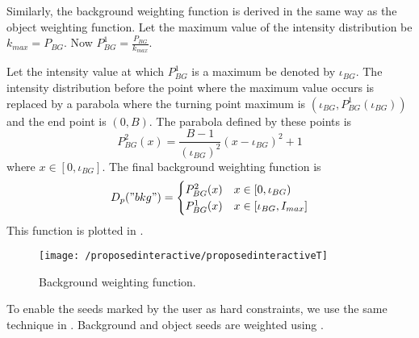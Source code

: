 \begin{definition} 
	Similarly, the background weighting function is derived in the same way as the object weighting function. Let the maximum value of the intensity distribution be $k_{max} = P_{BG}$. Now $P_{BG}^{1} = \frac{P_{BG}}{k_{max}}$.
	
	Let the intensity value at which $P_{BG}^{1}$ is a maximum be denoted by $\iota_{BG}$. The intensity distribution before the point where the maximum value occurs is replaced by a parabola where the turning point maximum is $\left(\iota_{BG}, P_{BG}^{1}(\iota_{BG})\right)$ and the end point is $(0,B)$. The parabola defined by these points is 
	\begin{equation}
	P_{BG}^2(x) = \frac{B-1}{(\iota_{BG})^2}(x-\iota_{BG})^2 +1 
	\end{equation}
	where $x \in [0,\iota_{BG}]$.
	The final background weighting function is
	\begin{equation}
	D_p("bkg") = \begin{cases} 
	P_{BG}^2(x) & x \in [0,\iota_{BG}) \\
	P_{BG}^1(x) & x \in [\iota_{BG},I_{max}]
	\end{cases}
	\end{equation}
	This function is plotted in .
	
	\begin{figure}[!h]
		\centering
		\texttt{[image: /proposedinteractive/proposedinteractiveT]}
		\caption{Background weighting function.}
		\label{fig:proposedinteractiveT}
	\end{figure}
\end{definition}

\begin{definition}
	To enable the seeds marked by the user as hard constraints, we use the same technique in \citep{Boykov2001_2}. Background and object seeds are weighted using .
\end{definition}


